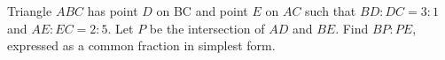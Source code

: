 Triangle $ABC$ has point $D$ on BC and point $E$ on $AC$ such that $BD : DC = 3 : 1$ and $AE : EC = 2 : 5$. Let $P$ be the intersection of $AD$ and $BE$. Find $BP : PE$, expressed as a common fraction in simplest form.
